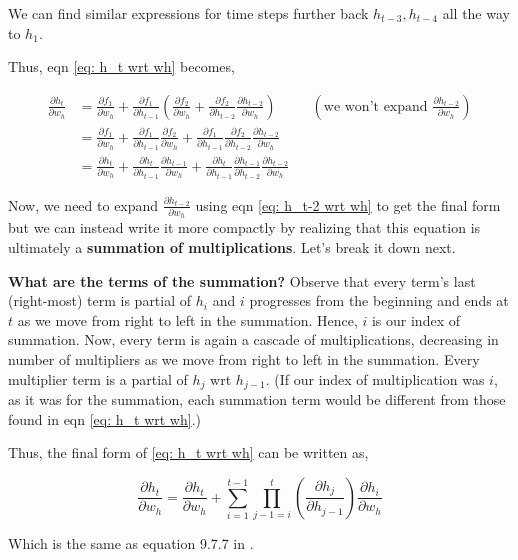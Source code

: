 \documentclass[12pt, letterpaper]{article}
\begin{document}
We can find similar expressions for time steps further back $h_{t-3}, h_{t-4}$ all the way to $h_1$.

Thus, eqn \ref{eq: h_t wrt wh} becomes, 

\begin{align}
    \frac{\partial h_t}{\partial w_h} &= \frac{\partial f_1}{\partial w_h} + \frac{\partial f_1}{\partial h_{t-1}}(\frac{\partial f_2}{\partial w_h} + \frac{\partial f_2}{\partial h_{t-2}}\frac{\partial h_{t-2}}{\partial w_h}) && (\text{we won't expand $\frac{\partial h_{t-2}}{\partial w_h}$}) \\
                                      &= \frac{\partial f_1}{\partial w_h} + \frac{\partial f_1}{\partial h_{t-1}}\frac{\partial f_2}{\partial w_h} + \frac{\partial f_1}{\partial h_{t-1}}\frac{\partial f_2}{\partial h_{t-2}}\frac{\partial h_{t-2}}{\partial w_h} \\
                                      &= \frac{\partial h_t}{\partial w_h} + \frac{\partial h_t}{\partial h_{t-1}}\frac{\partial h_{t-1}}{\partial w_h} + \frac{\partial h_t}{\partial h_{t-1}}\frac{\partial h_{t-1}}{\partial h_{t-2}}\frac{\partial h_{t-2}}{\partial w_h}
\end{align}

Now, we need to expand $\frac{\partial h_{t-2}}{\partial w_h}$ using eqn \ref{eq: h_t-2 wrt wh} to get the final
form but we can instead write it more compactly by realizing that this equation is ultimately 
a \textbf{summation of multiplications}. Let's break it down next.

\textbf{What are the terms of the summation?} Observe that every term's last (right-most) term is 
partial of $h_i$ and $i$ progresses from the beginning and ends at $t$ as we move from right to left
in the summation. Hence, $i$ is our index of summation. Now, every term is again a cascade of 
multiplications, decreasing in  number of multipliers as we move from right to left in the summation.
Every multiplier term is a partial of $h_j$ wrt $h_{j-1}$. (If our index of multiplication was $i$, as it was for the summation, each summation term would be different from
those found in eqn \ref{eq: h_t wrt wh}.)

Thus, the final form of \ref{eq: h_t wrt wh} can be written as,

\[
\boxed{\frac{\partial h_t}{\partial w_h} = \frac{\partial h_t}{\partial w_h} + \sum_{i=1}^{t-1}\prod_{j-1=i}^{t} (\frac{\partial h_j}{\partial h_{j-1}}) \frac{\partial h_i}{\partial w_h}
}
\]

Which is the same as equation 9.7.7 in \cite{d2l_bptt}.

\printbibliography
\end{document}
